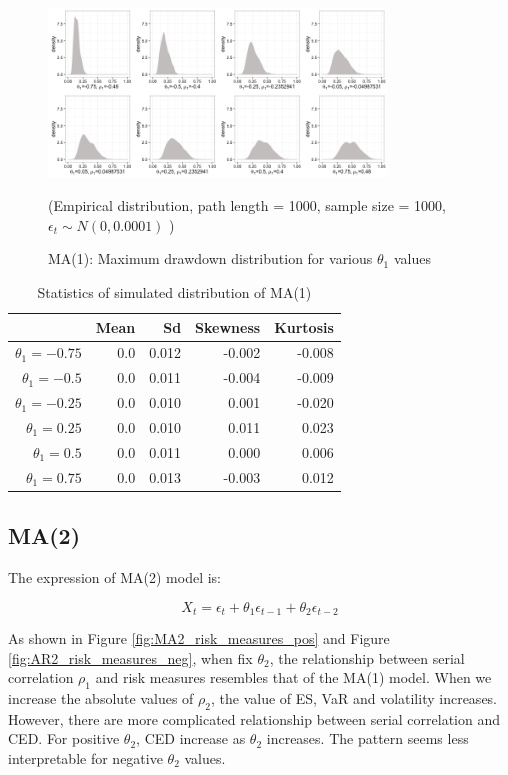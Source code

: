 \documentclass[11pt]{article}
\begin{document}
\begin{figure}[H]
\centering
\includegraphics[width = 0.8\textwidth]{../figures/simulation/MA1_maxDrawdown_dist}
\caption{MA(1): Maximum drawdown distribution for various $\theta_1$ values}
(Empirical distribution, path length = 1000, sample size = 1000, $\epsilon_t \sim N(0, 0.0001)$ )
\label{fig:MA1_maxDrawdown_dist}
\end{figure}

\begin{table}[H]
\centering
\begin{tabular}{|r |r r r r|}
\hline
& Mean & Sd & Skewness & Kurtosis \\
\hline
$\theta_1 = -0.75$ & 0.0 & 0.012 & -0.002 & -0.008\\
$\theta_1 = -0.5$ & 0.0 & 0.011 & -0.004 & -0.009\\
$\theta_1 = -0.25$ & 0.0 &  0.010 &  0.001 & -0.020\\
$\theta_1 = 0.25$ & 0.0 &  0.010 & 0.011 & 0.023\\
$\theta_1 = 0.5$ & 0.0 & 0.011 & 0.000 & 0.006\\
$\theta_1 = 0.75$ & 0.0 & 0.013 & -0.003 & 0.012\\
\hline
\end{tabular}
\caption{Statistics of simulated distribution of MA(1)}
\label{table: MA1_return}
\end{table}

\subsection{MA(2)} %

The expression of MA(2) model is:

\begin{equation}
X_t = \epsilon_t + \theta_1\epsilon_{t-1} + \theta_2\epsilon_{t-2}
\end{equation}

As shown in Figure \ref{fig:MA2_risk_measures_pos} and Figure \ref{fig:AR2_risk_measures_neg}, when fix $\theta_2$, the relationship between serial correlation $\rho_1$ and risk measures resembles that of the MA(1) model. When we increase the absolute values of $\rho_2$, the value of ES, VaR and volatility increases. However, there are more complicated relationship between serial correlation and CED. For positive $\theta_2$, CED increase as $\theta_2$ increases. The pattern seems less interpretable for negative $\theta_2$ values. 
\end{document}
